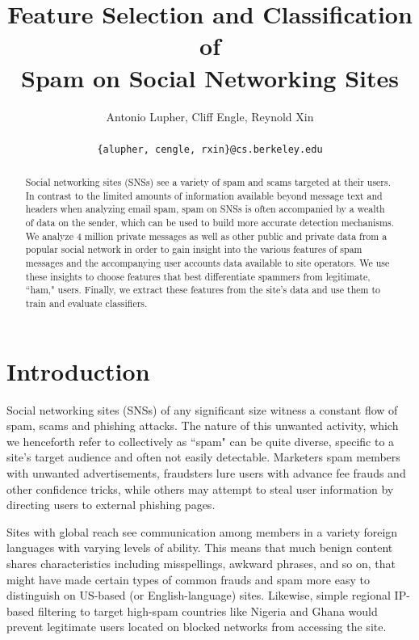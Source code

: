 \documentclass[preprint]{acm_proc_article-sp}
\begin{document}
\title{Feature Selection and Classification of \\
    Spam on Social Networking Sites}

\author{
Antonio Lupher,
Cliff Engle,
Reynold Xin\\\\
\texttt{\{alupher, cengle, rxin\}@cs.berkeley.edu}
}

\maketitle
\begin{abstract}
Social networking sites (SNSs) see a variety of spam and scams targeted at 
their users. In contrast to the limited amounts of information available beyond 
message text and headers when analyzing email spam, spam on SNSs is often accompanied 
by a wealth of data on the sender, which can be used to build more accurate detection mechanisms. 
We analyze 4 million private messages as well as other public and private data from 
a popular social network in order to gain insight into the various features of 
spam messages and the accompanying user accounts data available to site operators. 
We use these insights to choose features that best differentiate spammers from 
legitimate, ``ham," users.  Finally, we extract these features from the site's data 
and use them to train and evaluate classifiers.
\end{abstract}

\maketitle

\section{Introduction}

Social networking sites (SNSs) of any significant size witness a constant flow of spam, 
scams and phishing attacks.  The nature of this unwanted activity, which we henceforth refer to 
collectively as ``spam" can be 
quite diverse, specific to a site's target audience and often not easily detectable. Marketers 
spam members with unwanted advertisements, fraudsters lure users with advance fee frauds and 
other confidence tricks, while others may attempt to steal user information by directing users 
to external phishing pages. 

Sites with global reach see communication among members in a variety foreign languages with 
varying levels of ability. This means that much benign content shares characteristics including 
misspellings, awkward phrases, and so on, that might have made certain types of common frauds and spam 
more easy to distinguish on US-based (or English-language) sites. Likewise, simple regional IP-based 
filtering to target high-spam countries like Nigeria and Ghana would prevent legitimate users 
located on blocked networks from accessing the site.
\end{document}
